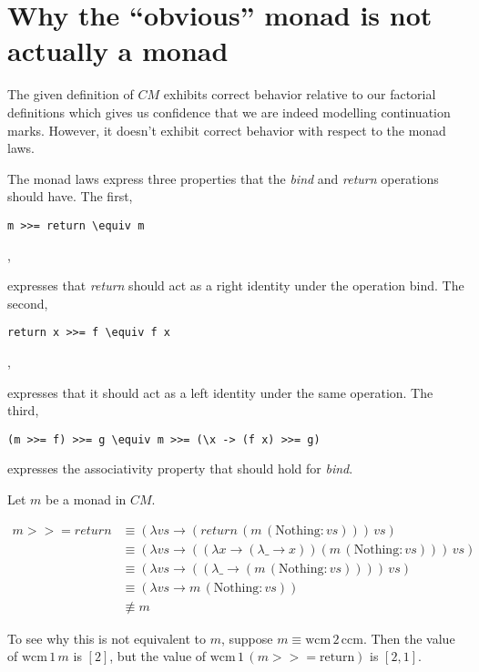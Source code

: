 \documentclass[ms,electronic,twosidetoc,letterpaper,chaptercenter,parttop]{byumsphd}
\begin{document}
\begin{verbatim}
\end{verbatim}

\section{Why the ``obvious'' monad is not actually a monad}

The given definition of $CM$ exhibits correct behavior relative to our 
factorial definitions which gives us confidence that we are indeed 
modelling continuation marks. However, it doesn't exhibit correct behavior 
with respect to the monad laws.

The monad laws express three properties that the \emph{bind} and \emph{return} 
operations should have. The first,

\begin{verbatim}
m >>= return \equiv m
\end{verbatim},

expresses that \emph{return} should act as a right identity under the 
operation bind. The second,

\begin{verbatim}
return x >>= f \equiv f x
\end{verbatim},

expresses that it should act as a left identity under the same operation. The 
third,

\begin{verbatim}
(m >>= f) >>= g \equiv m >>= (\x -> (f x) >>= g)
\end{verbatim}

expresses the associativity property that should hold for \emph{bind}.

Let $m$ be a monad in $CM$.

\begin{align*}
m >>= return &\equiv (\lambda vs \rightarrow (return\,(m\,(\mathrm{Nothing}:vs)))\,vs)\\
             &\equiv (\lambda vs \rightarrow ((\lambda x \rightarrow (\lambda \_ \rightarrow x)) (m\,(\mathrm{Nothing}:vs)))\,vs)\\
             &\equiv (\lambda vs \rightarrow ((\lambda \_ \rightarrow (m\,(\mathrm{Nothing}:vs))))\,vs)\\
             &\equiv (\lambda vs \rightarrow m\,(\mathrm{Nothing}:vs))\\
             &\not\equiv m
\end{align*}

To see why this is not equivalent to $m$, suppose $m\equiv 
\mathrm{wcm}\,2\,\mathrm{ccm}$. Then the value of $\mathrm{wcm}\,1\,m$ is
$[2]$, but the value of $\mathrm{wcm}\,1\,(m>>=\mathrm{return})$ is $[2,1]$.



\end{document}
